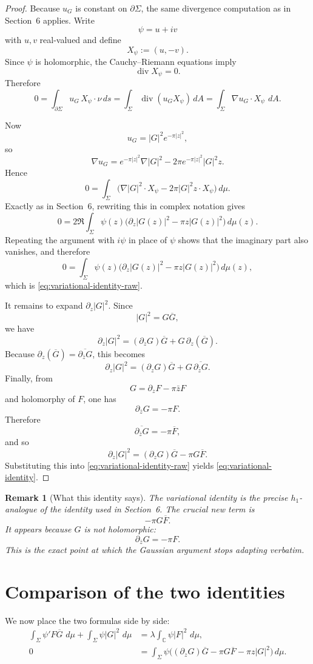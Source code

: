 \documentclass[11pt]{article}
\newtheorem{remark}[theorem]{Remark}
\newcommand{\C}{\mathbb C}
\newcommand{\dA}{\,dA}
\newcommand{\dmu}{\,d\mu}
\newcommand{\pw}{\partial_z}
\newcommand{\pwb}{\partial_{\bar z}}
\newcommand{\1}{\mathbf 1}
\begin{document}
\begin{proof}
Because \(u_G\) is constant on \(\partial\Sigma\), the same divergence computation as
in Section~6 applies. Write
\[
\psi=u+iv
\]
with \(u,v\) real-valued and define
\[
X_\psi:=(u,-v).
\]
Since \(\psi\) is holomorphic, the Cauchy--Riemann equations imply
\[
\operatorname{div}X_\psi=0.
\]
Therefore
\[
0
=
\int_{\partial\Sigma} u_G\,X_\psi\cdot\nu\,ds
=
\int_\Sigma \operatorname{div}(u_GX_\psi)\dA
=
\int_\Sigma \nabla u_G\cdot X_\psi\,\dA.
\]

Now
\[
u_G=|G|^2e^{-\pi|z|^2},
\]
so
\[
\nabla u_G
=
e^{-\pi|z|^2}\nabla|G|^2
-2\pi e^{-\pi|z|^2}|G|^2 z.
\]
Hence
\[
0
=
\int_\Sigma\Big(\nabla|G|^2\cdot X_\psi-2\pi |G|^2 z\cdot X_\psi\Big)\dmu.
\]
Exactly as in Section~6, rewriting this in complex notation gives
\[
0
=
2\Re\!\int_\Sigma \psi(z)\Big(\pw |G(z)|^2-\pi z|G(z)|^2\Big)\dmu(z).
\]
Repeating the argument with \(i\psi\) in place of \(\psi\) shows that the imaginary
part also vanishes, and therefore
\[
0
=
\int_\Sigma \psi(z)\Big(\pw |G(z)|^2-\pi z|G(z)|^2\Big)\dmu(z),
\]
which is \eqref{eq:variational-identity-raw}.

It remains to expand \(\pw |G|^2\). Since
\[
|G|^2=G\overline G,
\]
we have
\[
\pw|G|^2=(\pw G)\overline G+G\,\pw(\overline G).
\]
Because \(\pw(\overline G)=\overline{\pwb G}\), this becomes
\[
\pw|G|^2=(\pw G)\overline G+G\,\overline{\pwb G}.
\]
Finally, from
\[
G=\pw F-\pi\bar z F
\]
and holomorphy of \(F\), one has
\[
\pwb G=-\pi F.
\]
Therefore
\[
\overline{\pwb G}=-\pi\overline F,
\]
and so
\[
\pw|G|^2=(\pw G)\overline G-\pi G\overline F.
\]
Substituting this into \eqref{eq:variational-identity-raw} yields
\eqref{eq:variational-identity}.
\end{proof}

\begin{remark}[What this identity says]
The variational identity is the precise \(h_1\)-analogue of the identity used in
Section~6. The crucial new term is
\[
-\pi G\overline F.
\]
It appears because \(G\) is not holomorphic:
\[
\pwb G=-\pi F.
\]
This is the exact point at which the Gaussian argument stops adapting verbatim.
\end{remark}

\section{Comparison of the two identities}

We now place the two formulas side by side:
\begin{align}
\int_\Sigma \psi'F\overline G\,\dmu
+
\int_\Sigma \psi |G|^2\,\dmu
&=
\lambda\int_\C \psi |F|^2\,\dmu,
\label{eq:final-spectral}\\
0
&=
\int_\Sigma
\psi\Big((\pw G)\overline G-\pi G\overline F-\pi z|G|^2\Big)\dmu.
\label{eq:final-variational}
\end{align}
\end{document}
